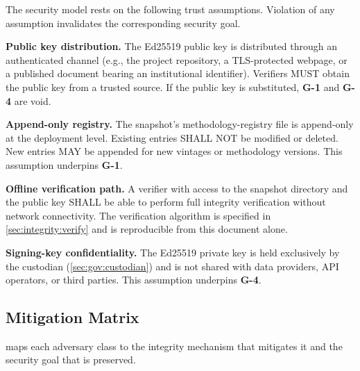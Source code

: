The security model rests on the following trust assumptions.  Violation of
any assumption invalidates the corresponding security goal.

\begin{description}[style=nextline, leftmargin=3.5em, labelwidth=3em]

  \item[\textbf{TA-1}] \textbf{Public key distribution.}\enspace
    The Ed25519 public key is distributed through an authenticated channel
    (e.g., the project repository, a TLS-protected webpage, or a published
    document bearing an institutional identifier).  Verifiers MUST obtain
    the public key from a trusted source.  If the public key is substituted,
    \textbf{G-1} and \textbf{G-4} are void.

  \item[\textbf{TA-2}] \textbf{Append-only registry.}\enspace
    The snapshot's methodology-registry file is append-only at the
    deployment level.  Existing entries SHALL NOT be
    modified or deleted.  New entries MAY be appended for new vintages or
    methodology versions.  This assumption underpins \textbf{G-1}.

  \item[\textbf{TA-3}] \textbf{Offline verification path.}\enspace
    A verifier with access to the snapshot directory and the public key
    SHALL be able to perform full integrity verification without network
    connectivity.  The verification algorithm is specified in
    \cref{sec:integrity:verify} and is reproducible from this
    document alone.

  \item[\textbf{TA-4}] \textbf{Signing-key confidentiality.}\enspace
    The Ed25519 private key is held exclusively by the custodian
    (\cref{sec:gov:custodian}) and is not shared with data providers,
    API operators, or third parties.  This assumption underpins
    \textbf{G-4}.

\end{description}

\subsection{Mitigation Matrix}\label{sec:threat:mitigation}

 maps each adversary class to the integrity
mechanism that mitigates it and the security goal that is preserved.

